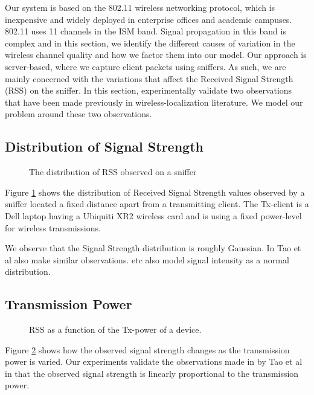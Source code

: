 Our system is based on the 802.11 wireless networking protocol, which is
inexpensive and widely deployed in enterprise offices and academic
campuses. 802.11 uses 11 channels in the ISM band. Signal
propagation in this band is complex and in this section, we identify the different
causes of variation in the wireless channel quality and how we factor
them into our model. Our approach is server-based, where we capture
client packets using sniffers. As such, we are mainly concerned with the
variations that affect the Received Signal Strength (RSS) on the
sniffer. In this section, experimentally validate two observations that have been made previously
in wireless-localization literature. We model our problem around these
two observations. 

\subsection{Distribution of Signal Strength}
\label{subsec:distributionofsignalstrength}

\begin{figure} [h!]
\centering
{}
\caption{The distribution of RSS observed on a sniffer}
\label{fig:distribution}
\end{figure}


Figure \ref{fig:distribution} shows the distribution of Received Signal
Strength values observed by a sniffer located a fixed distance apart
from a transmitting client. The Tx-client is a Dell laptop having a
Ubiquiti XR2 wireless card and is using a fixed power-level for wireless
transmissions. 

We observe that the Signal Strength distribution is roughly Gaussian. In
\cite{Tao:2003:WLL:941311.941314} Tao et al also make similar observations.
\cite{Haeberlen:2004:PRL:1023720.1023728, Moraes:2006:CWL:1164783.1164799} etc also model signal intensity
as a normal distribution.

\subsection{Transmission Power}
\label{subsec:transmissionpower}

\begin{figure} [h!]
\centering
{}
\caption{RSS as a function of the Tx-power of a device.}
\label{fig:txpower}
\end{figure}

Figure \ref{fig:txpower} shows how the observed signal strength changes
as the transmission power is varied. Our experiments validate the
observations made in \cite{Tao:2003:WLL:941311.941314} by Tao et al in that the observed
signal strength is linearly proportional to the transmission power.
